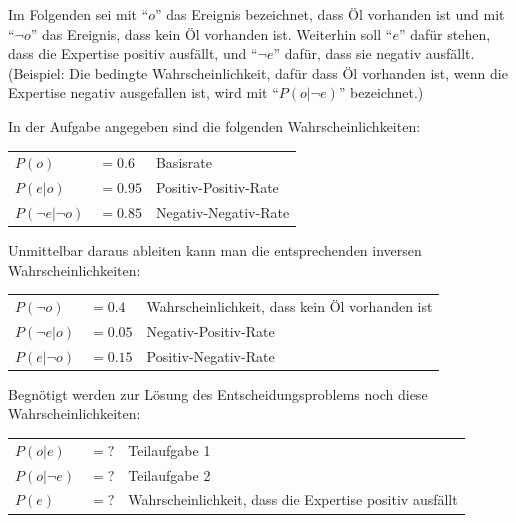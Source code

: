 \documentclass[10pt, a4paper, german]{article}
\numberwithin {equation}{section}
\begin{document}
Im Folgenden sei mit ``$o$'' das Ereignis bezeichnet, dass Öl vorhanden ist und
mit ``$\neg o$'' das Ereignis, dass kein Öl vorhanden ist. Weiterhin soll
``$e$'' dafür stehen, dass die Expertise positiv ausfällt, und ``$\neg e$''
dafür, dass sie negativ ausfällt. (Beispiel: Die bedingte Wahrscheinlichkeit,
dafür dass Öl vorhanden ist, wenn die Expertise negativ ausgefallen ist, wird
mit ``$P(o|\neg e)$'' bezeichnet.) 

\vspace{0.3cm}

\setlength{\parindent}{0cm}
In der Aufgabe angegeben sind
die folgenden Wahrscheinlichkeiten:

\vspace{0.1cm}

\begin{tabular}{lll}
$P(o)$&$   = 0.6$  & Basisrate \\
$P(e|o)$&$ = 0.95$ & Positiv-Positiv-Rate \\
$P(\neg e| \neg o)$&$ = 0.85$ & Negativ-Negativ-Rate \\ 
\end{tabular}

\vspace{0.3cm}

Unmittelbar daraus ableiten kann man die entsprechenden inversen
Wahrscheinlichkeiten:

\vspace{0.1cm}

\begin{tabular}{lll}
$P(\neg o)$&$ = 0.4$    & Wahrscheinlichkeit, dass kein Öl vorhanden ist \\
$P(\neg e|o)$&$ = 0.05$ & Negativ-Positiv-Rate \\
$P(e|\neg o)$&$ = 0.15$ & Positiv-Negativ-Rate \\
\end{tabular}

\vspace{0.3cm}

Begnötigt werden zur Lösung des Entscheidungsproblems noch diese
Wahrscheinlichkeiten:

\vspace{0.1cm}

\begin{tabular}{lll}
$P(o|e)$&$ ={ } ?$  & Teilaufgabe 1 \\
$P(o|\neg e)$&$ ={ } ?$ & Teilaufgabe 2 \\
$P(e)$&$ ={ } ?$ & Wahrscheinlichkeit, dass die Expertise positiv ausfällt
\\
\end{tabular}
\end{document}

